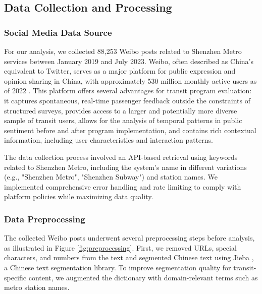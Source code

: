 \documentclass[a4paper,fleqn,12pt]{cas-sc}
\begin{document}
\subsection{Data Collection and Processing}

\subsubsection{Social Media Data Source}

For our analysis, we collected 88,253 Weibo posts related to Shenzhen Metro services between January 2019 and July 2023. Weibo, often described as China's equivalent to Twitter, serves as a major platform for public expression and opinion sharing in China, with approximately 530 million monthly active users as of 2022 \citep{wang2022empirical}. This platform offers several advantages for transit program evaluation: it captures spontaneous, real-time passenger feedback outside the constraints of structured surveys, provides access to a larger and potentially more diverse sample of transit users, allows for the analysis of temporal patterns in public sentiment before and after program implementation, and contains rich contextual information, including user characteristics and interaction patterns.


The data collection process involved an API-based retrieval using keywords related to Shenzhen Metro, including the system's name in different variations (e.g., "Shenzhen Metro", "Shenzhen Subway") and station names. We implemented comprehensive error handling and rate limiting to comply with platform policies while maximizing data quality.

\subsubsection{Data Preprocessing}

The collected Weibo posts underwent several preprocessing steps before analysis, as illustrated in Figure \ref{fig:preprocessing}. First, we removed URLs, special characters, and numbers from the text and segmented Chinese text using Jieba \citep{sun2012jieba}, a Chinese text segmentation library. To improve segmentation quality for transit-specific content, we augmented the dictionary with domain-relevant terms such as metro station names.
\end{document}
